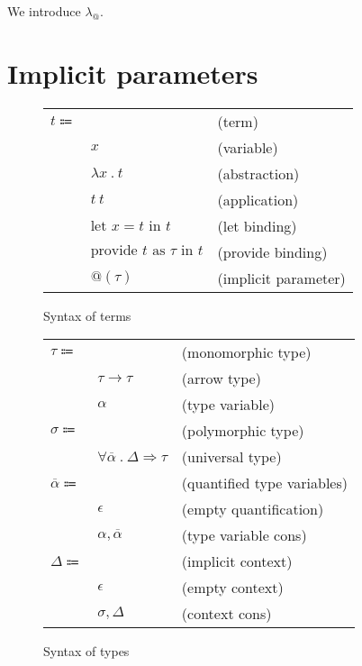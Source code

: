 \documentclass[acmlarge]{acmart}
\makeatletter
\newcommand\lambdaarobase{\lambda_@}
\newcommand\labs[2]{\lambda #1 \ . \ #2}
\newcommand\app[2]{#1 \ #2}
\newcommand\llet[3]{\text{let } #1 = #2 \text{ in } #3}
\newcommand\provide[3]{\text{provide } #1 \text{ as } #2 \text{ in } #3}
\newcommand\implicit[1]{ @ \! \left( #1 \right) }
\newcommand\larrow[2]{#1 \rightarrow #2}
\newcommand\tabs[3]{\forall #1 \ . \ #2 \Rightarrow #3}
\makeatother
\begin{document}
  We introduce $\lambdaarobase$.

\section{Implicit parameters}

  \begin{figure}[h!]
    \begin{mdframed}

      \begin{tabular}{l l l}
        $t \Coloneqq $ & & (term) \\
        & $x$ & (variable) \\
        & $\labs{x}{t}$ & (abstraction) \\
        & $\app{t}{t}$ & (application) \\
        & $\llet{x}{t}{t}$ & (let binding) \\
        & $\provide{t}{\tau}{t}$ & (provide binding) \\
        & $\implicit{\tau}$ & (implicit parameter)
      \end{tabular}

    \end{mdframed}
    \caption{Syntax of terms}
    \label{fig:terms_syntax}
  \end{figure}

  \begin{figure}[h!]
    \begin{mdframed}

      \begin{tabular}{l l l}
        $\tau \Coloneqq$ & & (monomorphic type) \\
        & $\larrow{\tau}{\tau}$ & (arrow type) \\
        & $\alpha$ & (type variable) \\
        $\sigma \Coloneqq$ & & (polymorphic type) \\
        & $\tabs{\overline{\alpha}}{\Delta}{\tau}$ & (universal type) \\
        $\overline{\alpha} \Coloneqq$ & & (quantified type variables) \\
        & $\epsilon$ & (empty quantification) \\
        & $\alpha, \overline{\alpha}$ & (type variable cons) \\
        $\Delta \Coloneqq$ & & (implicit context) \\
        & $\epsilon$ & (empty context) \\
        & $\sigma, \Delta$ & (context cons)
      \end{tabular}

    \end{mdframed}
    \caption{Syntax of types}
    \label{fig:types_syntax}
  \end{figure}
\end{document}

